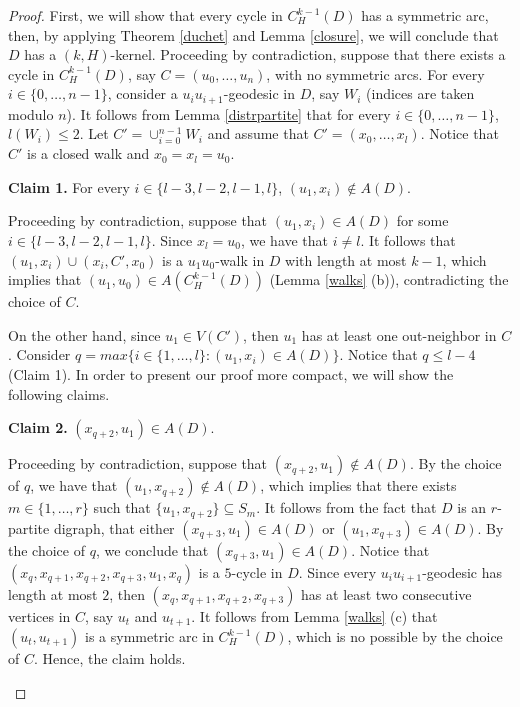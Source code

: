 \documentclass[10pt,a4paper]{article}
\begin{document}
\begin{proof}
First, we will show that every cycle in $C_{H}^{k-1}(D)$ has a symmetric arc, then, by applying Theorem \ref{duchet} and Lemma \ref{closure}, we will conclude that $D$ has a $(k,H)$-kernel. Proceeding by contradiction, suppose that there exists a cycle in  $C_{H}^{k-1}(D)$, say $C=(u_{0}, \ldots , u_{n})$, with no symmetric arcs.  For every $i \in \{0, \ldots , n-1\}$, consider a $u_{i}u_{i+1}$-geodesic in $D$, say $W_{i}$ (indices are taken modulo $n$). It follows from Lemma \ref{distrpartite} that for every $i \in \{ 0, \ldots , n-1\}$, $l(W_{i}) \leq 2$. Let $C'=\cup_{i=0}^{n-1}W_{i}$ and assume that $C' =(x_{0}, \ldots , x_{l})$. Notice that $C'$ is a closed walk and $x_{0}=x_{l} = u_{0}$.

\begin{description}
\item \textbf{Claim 1.} For every $i \in \{ l-3,l-2,l-1, l\}$, $(u_{1}, x_{i}) \notin A(D)$.

Proceeding by contradiction, suppose that $(u_{1}, x_{i}) \in A(D)$ for some $i \in \{ l-3, l-2,l-1,l\}$. Since $x_{l}=u_{0}$, we have that $i \neq l$. It follows that $(u_{1},x_{i}) \cup (x_{i}, C', x_{0})$ is a $u_{1}u_{0}$-walk in $D$ with length at most $k-1$, which implies that $(u_{1}, u_{0}) \in A(C_{H}^{k-1}(D))$  (Lemma \ref{walks} (b)), contradicting the choice of $C$.
\end{description}

On the other hand, since $u_{1} \in V(C')$, then $u_{1}$ has at least one out-neighbor in $C$. Consider $q=max \{ i \in \{ 1, \ldots , l \} : (u_{1}, x_{i}) \in A(D)\}$. Notice that $q \leq l-4$ (Claim 1).
In order to present our proof more compact, we will show the following claims.

	\begin{description}
	\item \textbf{Claim 2.} $(x_{q+2}, u_{1}) \in A(D)$.
	
	Proceeding by contradiction, suppose that $(x_{q+2}, u_{1}) \notin A(D)$. 
	By the choice of $q$, we have that $(u_{1}, x_{q+2}) \notin A(D)$, which implies that there exists $m \in \{1, \ldots , r \}$ such that $\{ u_{1}, x_{q+2} \} \subseteq S_{m}$. It follows from the fact that $D$ is an $r$-partite digraph, that either $(x_{q+3}, u_{1}) \in A(D)$ or $(u_{1}, x_{q+3}) \in A(D)$. By the choice of $q$, we conclude that $(x_{q+3},u_{1}) \in A(D)$. Notice that $(x_{q}, x_{q+1}, x_{q+2}, x_{q+3}, u_{1}, x_{q})$ is a $5$-cycle in $D$. 
Since every $u_{i}u_{i+1}$-geodesic has length at most $2$, then $(x_{q}, x_{q+1}, x_{q+2}, x_{q+3})$ has at least two consecutive vertices in $C$, say $u_{t}$ and $u_{t+1}$. It follows from Lemma \ref{walks} (c) that $(u_{t}, u_{t+1})$ is a symmetric arc in $C_{H}^{k-1}(D)$, which is no possible by the choice of $C$. Hence, the claim holds.	
\end{description}	



\end{proof}
\end{document}
